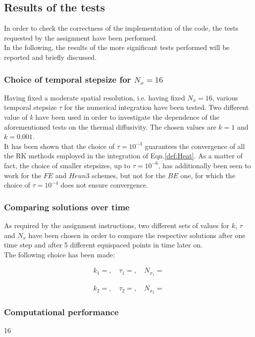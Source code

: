 \documentclass[11pt]{article}
\theoremstyle{theorem}
\theoremstyle{definition}
\begin{document}
\subsection{Results of the tests}
In order to check the correctness of the implementation of the code, the tests requested by the assignment have been performed.\\
In the following, the results of the more significant tests performed will be reported and briefly discussed.\\

\subsubsection{Choice of temporal stepsize for $N_x=16$}
Having fixed a moderate spatial resolution, i.e. having fixed $N_x=16$, various temporal stepsize $\tau$ for the numerical integration have been tested. Two different value of \emph{k} have been used in order to investigate the dependence of the aforementioned tests on the thermal diffusivity. The chosen values are $k=1$ and $k=0.001$.\\
It has been shown that the choice of $\tau=10^{-3}$ guarantees the convergence of all the RK methods employed in the integration of Eqn.\ref{def:Heat}. As a matter of fact, the choice of smaller stepsizes, up to $\tau=10^{-6}$, has additionally been seen to work for the $FE$ and $Heun3$ schemes, but not for the $BE$ one, for which the choice of $\tau=10^{-4}$ does not ensure convergence.\\ 

\subsubsection{Comparing solutions over time}
As required by the assignment instructions, two different sets of values for $k$, $\tau$ and $N_x$ have been chosen in order to compare the respective solutions after one time step and after 5 different equispaced points in time later on.\\
The following choice has been made:

\begin{align}
	\label{eqn:set-1}
	k_1=, \quad\tau_1=, \quad N_{x_1}=
\end{align}

\begin{align}
\label{eqn:set-2}
k_2=, \quad\tau_2=, \quad N_{x_2}=
\end{align} 

\subsubsection{Computational performance}
16 
\end{document}
